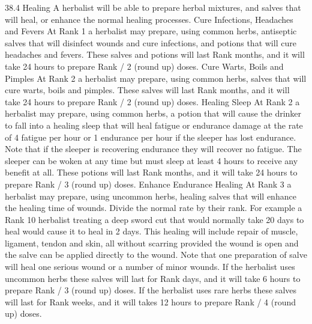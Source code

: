 \documentclass[a4paper]{article}
\begin{document}
\begin{multicols}{3}
38.4 Healing
A herbalist will be able to prepare herbal mixtures,
and salves that will heal, or enhance the normal
healing processes.
Cure Infections, Headaches and Fevers
At Rank 1 a herbalist may prepare, using common
herbs, antiseptic salves that will disinfect wounds
and cure infections, and potions that will cure
headaches and fevers. These salves and potions
will last Rank months, and it will take 24 hours to
prepare Rank / 2 (round up) doses.
Cure Warts, Boils and Pimples
At Rank 2 a herbalist may prepare, using common
herbs, salves that will cure warts, boils and pimples. These salves will last Rank months, and it
will take 24 hours to prepare Rank / 2 (round up)
doses.
Healing Sleep
At Rank 2 a herbalist may prepare, using common
herbs, a potion that will cause the drinker to fall
into a healing sleep that will heal fatigue or endurance damage at the rate of 4 fatigue per hour or 1
endurance per hour if the sleeper has lost endurance. Note that if the sleeper is recovering endurance they will recover no fatigue. The sleeper can
be woken at any time but must sleep at least 4
hours to receive any benefit at all. These potions
will last Rank months, and it will take 24 hours to
prepare Rank / 3 (round up) doses.
Enhance Endurance Healing
At Rank 3 a herbalist may prepare, using uncommon herbs, healing salves that will enhance the
healing time of wounds. Divide the normal rate by
their rank. For example a Rank 10 herbalist treating a deep sword cut that would normally take
20 days to heal would cause it to heal in 2 days.
This healing will include repair of muscle, ligament, tendon and skin, all without scarring provided the wound is open and the salve can be applied directly to the wound. Note that one preparation of salve will heal one serious wound or a
number of minor wounds. If the herbalist uses
uncommon herbs these salves will last for Rank
days, and it will take 6 hours to prepare Rank / 3
(round up) doses. If the herbalist uses rare herbs
these salves will last for Rank weeks, and it will
takes 12 hours to prepare Rank / 4 (round up)
doses.


\end{multicols}
\end{document}
